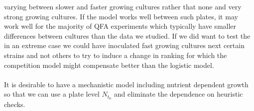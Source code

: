 varying between slower and faster growing cultures rather that none
and very strong growing cultures. If the model works well between such
plates, it may work well for the majority of QFA experiments which
typically have smaller differences between cultures than the data we
studied. If we did want to test the in an extreme case we could have
inoculated fast growing cultures next certain strains and not others
to try to induce a change in ranking for which the competition model
might compensate better than the logistic model.
\\\\
It is desirable to have a mechanistic model including nutrient
dependent growth so that we can use a plate level \(N_{t_{0}}\) and
eliminate the dependence on heuristic checks.







